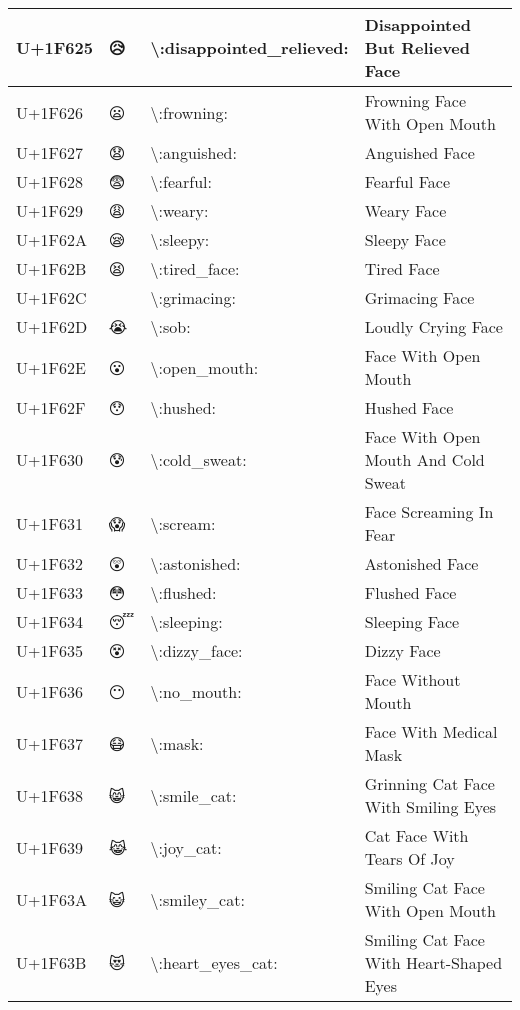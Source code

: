 \begin{table}[h]
\begin{tabulary}{\linewidth}{|L|L|L|L|}
\hline
U+1F625 & 😥 & {\textbackslash}:disappointed\_relieved: & Disappointed But Relieved Face \\
\hline
U+1F626 & 😦 & {\textbackslash}:frowning: & Frowning Face With Open Mouth \\
\hline
U+1F627 & 😧 & {\textbackslash}:anguished: & Anguished Face \\
\hline
U+1F628 & 😨 & {\textbackslash}:fearful: & Fearful Face \\
\hline
U+1F629 & 😩 & {\textbackslash}:weary: & Weary Face \\
\hline
U+1F62A & 😪 & {\textbackslash}:sleepy: & Sleepy Face \\
\hline
U+1F62B & 😫 & {\textbackslash}:tired\_face: & Tired Face \\
\hline
U+1F62C & 😬 & {\textbackslash}:grimacing: & Grimacing Face \\
\hline
U+1F62D & 😭 & {\textbackslash}:sob: & Loudly Crying Face \\
\hline
U+1F62E & 😮 & {\textbackslash}:open\_mouth: & Face With Open Mouth \\
\hline
U+1F62F & 😯 & {\textbackslash}:hushed: & Hushed Face \\
\hline
U+1F630 & 😰 & {\textbackslash}:cold\_sweat: & Face With Open Mouth And Cold Sweat \\
\hline
U+1F631 & 😱 & {\textbackslash}:scream: & Face Screaming In Fear \\
\hline
U+1F632 & 😲 & {\textbackslash}:astonished: & Astonished Face \\
\hline
U+1F633 & 😳 & {\textbackslash}:flushed: & Flushed Face \\
\hline
U+1F634 & 😴 & {\textbackslash}:sleeping: & Sleeping Face \\
\hline
U+1F635 & 😵 & {\textbackslash}:dizzy\_face: & Dizzy Face \\
\hline
U+1F636 & 😶 & {\textbackslash}:no\_mouth: & Face Without Mouth \\
\hline
U+1F637 & 😷 & {\textbackslash}:mask: & Face With Medical Mask \\
\hline
U+1F638 & 😸 & {\textbackslash}:smile\_cat: & Grinning Cat Face With Smiling Eyes \\
\hline
U+1F639 & 😹 & {\textbackslash}:joy\_cat: & Cat Face With Tears Of Joy \\
\hline
U+1F63A & 😺 & {\textbackslash}:smiley\_cat: & Smiling Cat Face With Open Mouth \\
\hline
U+1F63B & 😻 & {\textbackslash}:heart\_eyes\_cat: & Smiling Cat Face With Heart-Shaped Eyes \\

\end{tabulary}
\end{table}
